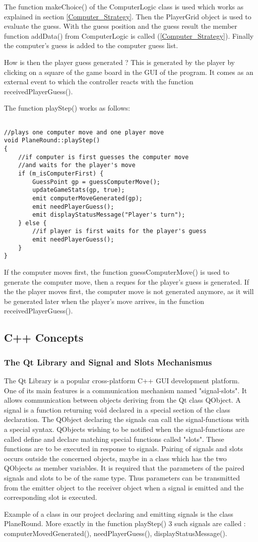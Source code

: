 The function makeChoice() of the ComputerLogic class is used which works as explained in section \ref{Computer_Strategy}. Then the PlayerGrid object is used to evaluate the guess. With the guess position and the guess result the member function addData() from ComputerLogic is called (\ref{Computer_Strategy}). Finally the computer's guess is added to the computer guess list. 

How is then the player guess generated ? This is generated by the player by clicking on a square of the game board in the GUI of the program. It comes as an external event to which the controller reacts with the function receivedPlayerGuess().

The function playStep() works as follows:

\begin{lstlisting} 

//plays one computer move and one player move
void PlaneRound::playStep()
{
	//if computer is first guesses the computer move
	//and waits for the player's move
	if (m_isComputerFirst) {
		GuessPoint gp = guessComputerMove();
		updateGameStats(gp, true);
		emit computerMoveGenerated(gp);
		emit needPlayerGuess();
		emit displayStatusMessage("Player's turn");
	} else {
		//if player is first waits for the player's guess
		emit needPlayerGuess();
	}
}

\end{lstlisting}

If the computer moves first, the function guessComputerMove() is used to generate the computer move, then a reques for the player's guess is generated. If the the player moves first, the computer move is not generated anymore, as it will be generated later when the player's move arrives, in the function receivedPlayerGuess().

\subsection{C++ Concepts}

\subsubsection{The Qt Library and Signal and Slots Mechanismus} \label {Qt_Signals_Slots}

The Qt Library is a popular cross-platform C++ GUI development platform. One of its main features is a communication mechanism named "signal-slots". It allows communication between objects deriving from the Qt class QObject. A signal is a function returning void declared in a special section of the class declaration. The QObject declaring the signals can call the signal-functions with a special syntax. QObjects wishing to be notified when the signal-functions are called define and declare matching special functions called "slots". These functions are to be executed in response to signals. Pairing of signals and slots occurs outside the concerned objects, maybe in a class which has the two QObjects as member variables. It is required that the parameters of the paired signals and slots to be of the same type. Thus parameters can be transmitted from the emitter object to the receiver object when a signal is emitted and the corresponding slot is executed. 

Example of a class in our project declaring and emitting signals is the class PlaneRound. More exactly in the function playStep() 3 such signals are called : computerMovedGenerated(), needPlayerGuess(), displayStatusMessage().

